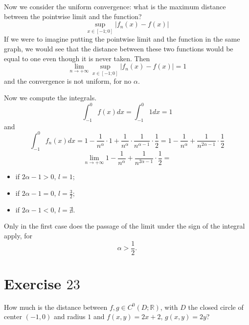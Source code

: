 \documentclass[a4paper, twoside, openany]{book}
\newcommand{\R}{\mathbb{R}}
\begin{document}
Now we consider the uniform convergence: what is the maximum distance between the pointwise limit and the function?
$$\sup_{x \in [-1; 0]} | f_n(x) - f(x)|$$
If we were to imagine putting the pointwise limit and the function in the same graph, we would see that the distance between these two functions would be equal to one even though it is never taken. Then
$$\lim_{n \rightarrow +\infty} \sup_{x \in [-1; 0]} |f_n(x) - f(x)| = 1$$
and the convergence is not uniform, for no $\alpha$. \par 
Now we compute the integrals.
$$\int_{-1}^0 f(x) dx = \int_{-1}^0 1 dx = 1$$
and
$$\int_{-1}^0 f_n(x) dx = 1 - \frac{1}{n^{\alpha}} \cdot 1 + \frac{1}{n^{\alpha}} \cdot \frac{1}{n^{\alpha - 1}} \cdot \frac{1}{2} = 1 - \frac{1}{n^{\alpha}} + \frac{1}{n^{2\alpha -1}} \cdot \frac{1}{2}$$
$$\lim_{n \rightarrow +\infty} 1 - \frac{1}{n^{\alpha}} + \frac{1}{n^{2\alpha -1}} \cdot \frac{1}{2} = $$
\begin{itemize}
\item if $2\alpha -  1 > 0$, $l = 1$;
\item if $2\alpha - 1 = 0$, $l = \frac{3}{2}$;
\item if $2\alpha - 1 < 0$, $l = \nexists$.
\end{itemize}
Only in the first case does the passage of the limit under the sign of the integral apply, for
$$\alpha > \frac{1}{2}.$$
\clearpage
\section*{Exercise $23$}
How much is the distance between $f,g \in C^0(D; \R)$, with $D$ the closed circle of center $(-1, 0)$ and radius $1$ and $f(x, y) = 2x + 2$, $g(x, y) = 2y$?
\end{document}
